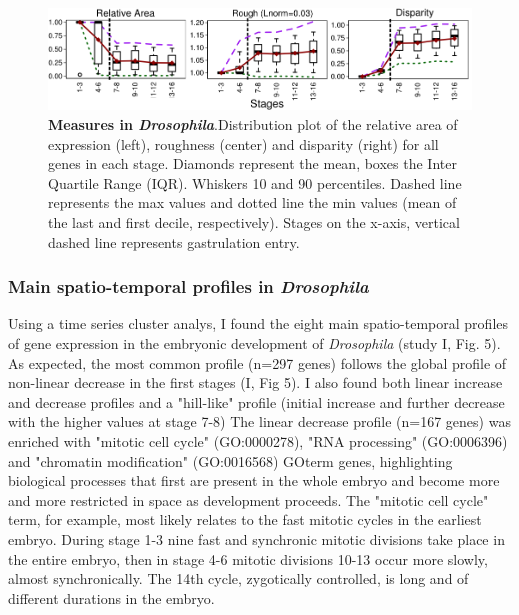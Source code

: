 \begin{figure}[b]
  \includegraphics[width=\textwidth]{./Images/Art-I/3_measures.png}
  \centering
  \caption{\textbf{Measures in \textit{Drosophila}}.Distribution plot of the relative area of expression (left), roughness (center) and disparity (right) for all genes in each stage. Diamonds represent the mean, boxes the Inter Quartile Range (IQR). Whiskers 10 and 90 percentiles. Dashed line represents the max values and dotted line the min values (mean of the last and first decile, respectively). Stages on the x-axis, vertical dashed line represents gastrulation entry.
  }
  \label{fig:Art-I-3measures}
\end{figure}

\subsubsection{Main spatio-temporal profiles in \textit{Drosophila}}
Using a time series cluster analys, I found the eight main spatio-temporal profiles of gene expression in the embryonic development of \textit{Drosophila} (study I, Fig. 5). As expected, the most common profile (n=297 genes) follows the global profile of non-linear decrease in the first stages (I, Fig 5).
%
I also found both linear increase and decrease profiles and a "hill-like" profile (initial increase and further decrease with the higher values at stage 7-8)
%
The linear decrease profile (n=167 genes) was enriched with "mitotic cell cycle" (GO:0000278), "RNA processing" (GO:0006396) and "chromatin modification" (GO:0016568) GOterm genes, highlighting biological processes that first are present in the whole embryo and become more and more restricted in space as development proceeds.
The "mitotic cell cycle" term, for example, most likely relates to the fast mitotic cycles in the earliest embryo. During stage 1-3 nine fast and synchronic mitotic divisions take place in the entire embryo, then in stage 4-6 mitotic divisions 10-13 occur more slowly, almost synchronically. The 14th cycle, zygotically controlled, is long and of different durations in the embryo.

